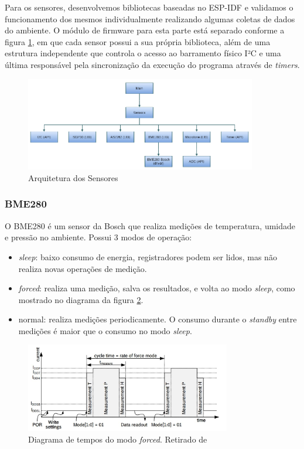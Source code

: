 \documentclass[../monografia.tex]{subfiles}
\begin{document}
Para os sensores, desenvolvemos bibliotecas baseadas no ESP-IDF e validamos o funcionamento dos mesmos individualmente realizando algumas coletas de dados do ambiente. O módulo de firmware para esta parte está separado conforme a figura \ref{fig:sensors-arch}, em que cada sensor possui a sua própria biblioteca, além de uma estrutura independente que controla o acesso ao barramento físico I²C e uma última responsável pela sincronização da execução do programa através de \textit{timers}.

\begin{figure}[h]
	\centering
	\includegraphics[width=0.9\textwidth]{sensors-arch}
	\caption{Arquitetura dos Sensores}
	\label{fig:sensors-arch}
\end{figure}

\subsubsection{BME280}

O BME280 é um sensor da Bosch que realiza medições de temperatura, umidade e pressão no ambiente. Possui 3 modos de operação: \cite{bme280}
\begin{itemize}
	\item \textit{sleep}: baixo consumo de energia, registradores podem ser lidos, mas não realiza novas operações de medição.
	\item \textit{forced}: realiza uma medição, salva os resultados, e volta ao modo \textit{sleep}, como mostrado no diagrama da figura \ref{fig:time_bme280}.

	\item normal: realiza medições periodicamente. O consumo durante o \textit{standby} entre medições é maior que o consumo no modo \textit{sleep}. 
\end{itemize}

\begin{figure}[h]
	\centering
	\includegraphics[width=0.8\textwidth]{timing_bme280}
	\caption{Diagrama de tempos do modo \textit{forced}. Retirado de \cite{bme280}}
	\label{fig:time_bme280}
\end{figure}
\end{document}
